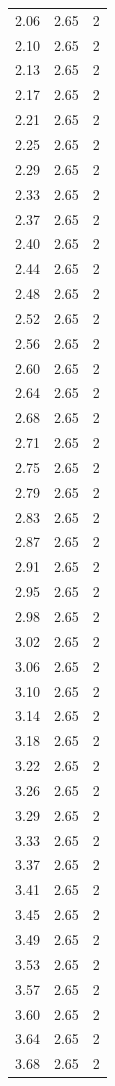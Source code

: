 \begin{longtable}{lrr}
  2.06 & 2.65 & 2 \\
  2.10 & 2.65 & 2 \\
  2.13 & 2.65 & 2 \\
  2.17 & 2.65 & 2 \\
  2.21 & 2.65 & 2 \\
  2.25 & 2.65 & 2 \\
  2.29 & 2.65 & 2 \\
  2.33 & 2.65 & 2 \\
  2.37 & 2.65 & 2 \\
  2.40 & 2.65 & 2 \\
  2.44 & 2.65 & 2 \\
  2.48 & 2.65 & 2 \\
  2.52 & 2.65 & 2 \\
  2.56 & 2.65 & 2 \\
  2.60 & 2.65 & 2 \\
  2.64 & 2.65 & 2 \\
  2.68 & 2.65 & 2 \\
  2.71 & 2.65 & 2 \\
  2.75 & 2.65 & 2 \\
  2.79 & 2.65 & 2 \\
  2.83 & 2.65 & 2 \\
  2.87 & 2.65 & 2 \\
  2.91 & 2.65 & 2 \\
  2.95 & 2.65 & 2 \\
  2.98 & 2.65 & 2 \\
  3.02 & 2.65 & 2 \\
  3.06 & 2.65 & 2 \\
  3.10 & 2.65 & 2 \\
  3.14 & 2.65 & 2 \\
  3.18 & 2.65 & 2 \\
  3.22 & 2.65 & 2 \\
  3.26 & 2.65 & 2 \\
  3.29 & 2.65 & 2 \\
  3.33 & 2.65 & 2 \\
  3.37 & 2.65 & 2 \\
  3.41 & 2.65 & 2 \\
  3.45 & 2.65 & 2 \\
  3.49 & 2.65 & 2 \\
  3.53 & 2.65 & 2 \\
  3.57 & 2.65 & 2 \\
  3.60 & 2.65 & 2 \\
  3.64 & 2.65 & 2 \\
  3.68 & 2.65 & 2 \\

\end{longtable}
